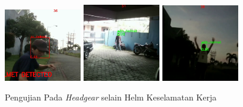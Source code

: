 \begin{figure} [h!]
  \centering
  \includegraphics[width=0.3\textwidth]{gambar/pengujian/Screenshot_105.png}
  \includegraphics[width=0.3\textwidth]{gambar/pengujian/Screenshot_106.png}
  \includegraphics[width=0.3\textwidth]{gambar/pengujian/Screenshot_107.png}
  \caption{Pengujian Pada \emph{Headgear} selain Helm Keselamatan Kerja}
  \label{fig:pengujian_headgear}  
\end{figure}



